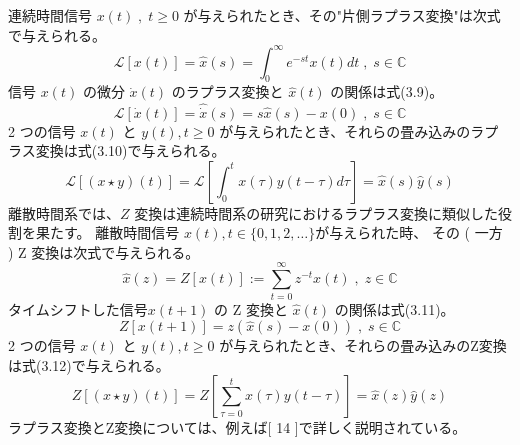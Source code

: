 \documentclass{jsarticle}
\begin{document}
連続時間信号 $x (t)\;,\;t\geq 0$ が与えられたとき、その"片側ラプラス変換"は次式で与えられる。
\begin{equation}
  \mathcal{L} [x(t)] = \hat{x}(s) = \int^\infty_0 e^{-st}x(t) dt \;,\;s \in \mathbb{C} 
\end{equation}
信号 $x ( t )$ の微分 $\dot{x} ( t )$ のラプラス変換と $\hat{x}( t )$ の関係は式(3.9)。
\begin{equation}
  \mathcal{L}[\dot{x}(t)] =\hat{\dot{x}}(s) = s\hat{x}(s)-x(0)\;,\;s\in\mathbb{C}
\end{equation}
2 つの信号 $x ( t )$ と $y ( t ), t\geq 0$ が与えられたとき、それらの畳み込みのラプラス変換は式(3.10)で与えられる。
\begin{equation}
  \mathcal{L}[(x\star y)(t)] = \mathcal{L}\left[ \int^t_0 x(\tau)y(t-\tau)d\tau \right] = \hat{x}(s)\hat{y}(s) \tag{3.10}
\end{equation}
離散時間系では、$Z$ 変換は連続時間系の研究におけるラプラス変換に類似した役割を果たす。
離散時間信号 $x ( t ) , t\in \{ 0 , 1 , 2 , \dots\}$が与えられた時、
その ( 一方 ) Z 変換は次式で与えられる。
\begin{equation}
  \hat{x}(z) = Z[x(t)] := \sum^\infty_{t=0} z^{-t}x(t)\;,\;z \in \mathbb{C}
\end{equation}
タイムシフトした信号$ x ( t + 1 )$ の Z 変換と $\hat{x}( t )$ の関係は式(3.11)。
\begin{equation}
  Z[x(t+1)] = z(\hat{x}(s)-x(0)) \;,\;s\in \mathbb{C} \tag{3.11}
\end{equation}
2 つの信号 $x ( t )$ と $y ( t ), t\geq 0$ が与えられたとき、それらの畳み込みのZ変換は式(3.12)で与えられる。
\begin{equation}
  Z[(x\star y)(t)] = Z\left[ \sum^t_{\tau=0} x(\tau)y(t-\tau) \right]=\hat{x}(z)\hat{y}(z) \tag{3.12}
\end{equation}
ラプラス変換とZ変換については、例えば[ 14 ]で詳しく説明されている。
\end{document}
